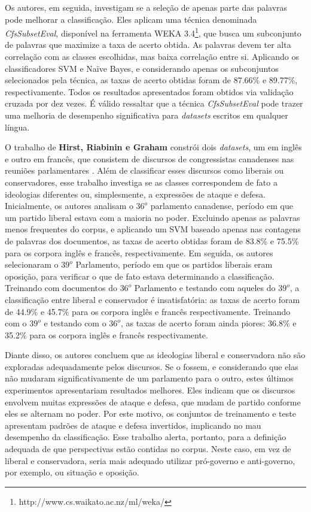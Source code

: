 Os autores, em seguida, investigam se a seleção de apenas parte das palavras pode melhorar a classificação. Eles aplicam uma técnica denominada \emph{CfsSubsetEval}, disponível na ferramenta WEKA 3.4\footnote{http://www.cs.waikato.ac.nz/ml/weka/}, que busca um subconjunto de palavras que maximize a taxa de acerto obtida. As palavras devem ter alta correlação com as classes escolhidas, mas baixa correlação entre si. Aplicando os classificadores SVM e Naïve Bayes, e considerando apenas os subconjuntos selecionados pela técnica, as taxas de acerto obtidas foram de 87.66\% e 89.77\%, respectivamente. Todos os resultados apresentados foram obtidos via validação cruzada por dez vezes. É válido ressaltar que a técnica \emph{CfsSubsetEval} pode trazer uma melhoria de desempenho significativa para \emph{datasets} escritos em qualquer língua.

O trabalho de \textbf{Hirst, Riabinin e Graham} constrói dois \emph{datasets}, um em inglês e outro em francês, que consistem de discursos de congressistas canadenses nas reuniões parlamentares \cite{hirst-et-al}. Além de classificar esses discursos como liberais ou conservadores, esse trabalho investiga se as classes correspondem de fato a ideologias diferentes ou, simplesmente, a expressões de ataque e defesa. Inicialmente, os autores analisam o \ensuremath{36^o} parlamento canadense, período em que um partido liberal estava com a maioria no poder. Excluindo apenas as palavras menos frequentes do corpus, e aplicando um SVM baseado apenas nas contagens de palavras dos documentos, as taxas de acerto obtidas foram de 83.8\% e 75.5\% para os corpora inglês e francês, respectivamente. Em seguida, os autores selecionaram o \ensuremath{39^o} Parlamento, período em que os partidos liberais eram oposição, para verificar o que de fato estava determinando a classificação. Treinando com documentos do \ensuremath{36^o} Parlamento e testando com aqueles do \ensuremath{39^o}, a classificação entre liberal e conservador é insatisfatória: as taxas de acerto foram de 44.9\% e 45.7\% para os corpora inglês e francês respectivamente. Treinando com o \ensuremath{39^o} e testando com o \ensuremath{36^o}, as taxas de acerto foram ainda piores: 36.8\% e 35.2\% para os corpora inglês e francês respectivamente.  

Diante disso, os autores concluem que as ideologias liberal e conservadora não são exploradas adequadamente pelos discursos. Se o fossem, e considerando que elas não mudaram significativamente de um parlamento para o outro, estes últimos experimentos apresentariam resultados melhores. Eles indicam que os discursos envolvem muitas expressões de ataque e defesa, que mudam de partido conforme eles se alternam no poder. Por este motivo, os conjuntos de treinamento e teste apresentam padrões de ataque e defesa invertidos, implicando no mau desempenho da classificação. Esse trabalho alerta, portanto, para a definição adequada de que perspectivas estão contidas no corpus. Neste caso, em vez de liberal e conservadora, seria mais adequado utilizar pró-governo e anti-governo, por exemplo, ou situação e oposição. %

